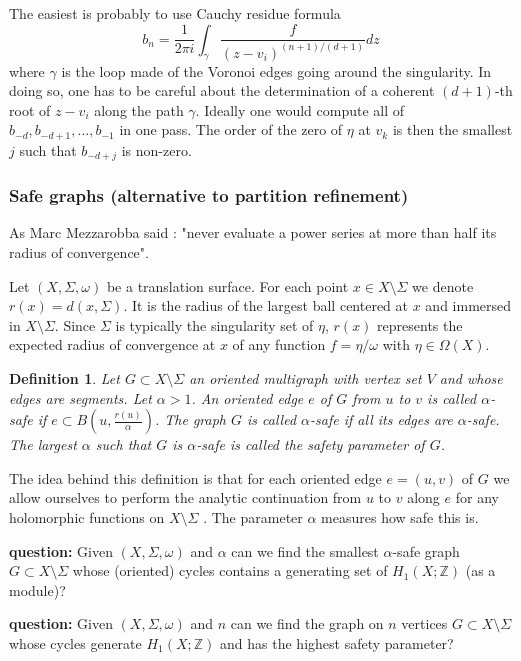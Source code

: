 \documentclass[a4paper,12pt]{article}
\def\bZ{\mathbb{Z}}
\newtheorem{definition}{Definition}
\begin{document}
The easiest is probably to use Cauchy residue formula
\[
b_n = \frac{1}{2 \pi i} \int_\gamma \frac{f}{(z-v_i)^{(n+1)/(d+1)}} dz
\]
where $\gamma$ is the loop made of the Voronoi edges going around
the singularity. In doing so, one has to be careful about the
determination of a coherent $(d+1)$-th root of $z-v_i$ along the path $\gamma$.
Ideally one would compute all of $b_{-d}, b_{-d+1}, \ldots, b_{-1}$
in one pass. The order of the zero of $\eta$ at $v_k$ is then the
smallest $j$ such that $b_{-d+j}$ is non-zero.

\subsubsection{Safe graphs (alternative to partition refinement)}
As Marc Mezzarobba said : "never evaluate a power series at more than half its radius of convergence".

Let $(X, \Sigma, \omega)$ be a translation surface. For each point $x \in X
\setminus \Sigma$ we denote $r(x) = d(x,\Sigma)$. It is the radius of the
largest ball centered at $x$ and immersed in $X \setminus \Sigma$. Since
$\Sigma$ is typically the singularity set of $\eta$, $r(x)$ represents
the expected radius of convergence at $x$ of any function $f = \eta / \omega$
with $\eta \in \Omega(X)$.

\begin{definition}
Let $G \subset X \setminus \Sigma$ an oriented multigraph with vertex set $V$ and whose
edges are segments. Let $\alpha > 1$. 
An oriented edge $e$ of $G$ from $u$ to $v$ is called
\emph{$\alpha$-safe} if $\displaystyle e \subset B\left(u, \frac{r(u)}{\alpha}\right)$.
The graph $G$ is called \emph{$\alpha$-safe} if all its edges are $\alpha$-safe.
The largest $\alpha$ such that $G$ is $\alpha$-safe is called the \emph{safety parameter}
of $G$.
\end{definition}

The idea behind this definition is that for each oriented edge $e = (u, v)$ of
$G$ we allow ourselves to perform the analytic continuation from $u$ to $v$
along $e$ for any holomorphic functions on $X \setminus \Sigma$ . The parameter
$\alpha$ measures how safe this is.

\textbf{question:} Given $(X, \Sigma, \omega)$ and $\alpha$ can we find the
smallest $\alpha$-safe graph $G \subset X \setminus \Sigma$ whose (oriented) cycles
contains a generating set of $H_1(X; \bZ)$ (as a module)?

\textbf{question:} Given $(X, \Sigma, \omega)$ and $n$ can we find the graph
on $n$ vertices $G \subset X \setminus \Sigma$ whose cycles generate $H_1(X; \bZ)$
and has the highest safety parameter?
\end{document}
